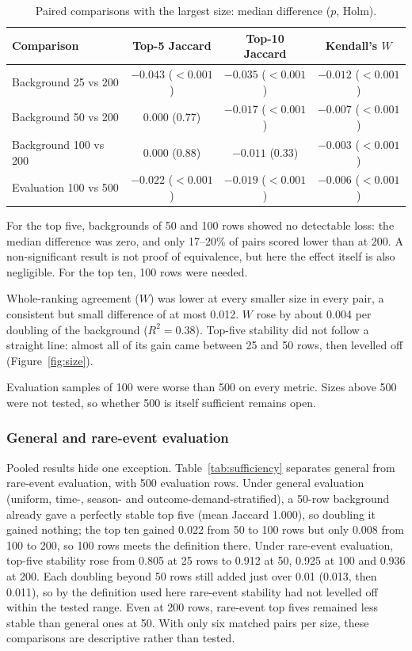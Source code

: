 \documentclass[11pt,a4paper]{article}
\begin{document}
\begin{table}[htbp]
\centering\small
\caption{Paired comparisons with the largest size: median difference ($p$, Holm).}
\label{tab:paired}
\begin{tabular}{lccc}
\toprule
Comparison & Top-5 Jaccard & Top-10 Jaccard & Kendall's $W$ \\
\midrule
Background 25 vs 200 & $-0.043$ ($<0.001$) & $-0.035$ ($<0.001$) & $-0.012$ ($<0.001$) \\
Background 50 vs 200 & $0.000$ (0.77) & $-0.017$ ($<0.001$) & $-0.007$ ($<0.001$) \\
Background 100 vs 200 & $0.000$ (0.88) & $-0.011$ (0.33) & $-0.003$ ($<0.001$) \\
Evaluation 100 vs 500 & $-0.022$ ($<0.001$) & $-0.019$ ($<0.001$) & $-0.006$ ($<0.001$) \\
\bottomrule
\end{tabular}
\end{table}

For the top five, backgrounds of 50 and 100 rows showed no detectable loss: the median difference was zero, and only 17--20\% of pairs scored lower than at 200. A non-significant result is not proof of equivalence, but here the effect itself is also negligible. For the top ten, 100 rows were needed.

Whole-ranking agreement ($W$) was lower at every smaller size in every pair, a consistent but small difference of at most 0.012. $W$ rose by about 0.004 per doubling of the background ($R^2 = 0.38$). Top-five stability did not follow a straight line: almost all of its gain came between 25 and 50 rows, then levelled off (Figure~\ref{fig:size}).

Evaluation samples of 100 were worse than 500 on every metric. Sizes above 500 were not tested, so whether 500 is itself sufficient remains open.

\subsubsection{General and rare-event evaluation}

Pooled results hide one exception. Table~\ref{tab:sufficiency} separates general from rare-event evaluation, with 500 evaluation rows. Under general evaluation (uniform, time-, season- and outcome-demand-stratified), a 50-row background already gave a perfectly stable top five (mean Jaccard 1.000), so doubling it gained nothing; the top ten gained 0.022 from 50 to 100 rows but only 0.008 from 100 to 200, so 100 rows meets the definition there. Under rare-event evaluation, top-five stability rose from 0.805 at 25 rows to 0.912 at 50, 0.925 at 100 and 0.936 at 200. Each doubling beyond 50 rows still added just over 0.01 (0.013, then 0.011), so by the definition used here rare-event stability had not levelled off within the tested range. Even at 200 rows, rare-event top fives remained less stable than general ones at 50. With only six matched pairs per size, these comparisons are descriptive rather than tested.
\end{document}

